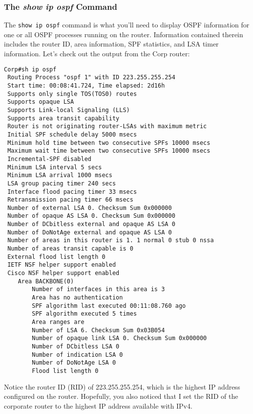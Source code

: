 \subsubsection[The \emph{show ip ospf}
Command]{\texorpdfstring{\protect\hypertarget{c18.xhtmlux5cux23c18-sec-12}{}{}The
\emph{show ip ospf} Command}{The show ip ospf Command}}

The \texttt{show\ ip\ ospf} command is what you'll need to display OSPF
information for one or all OSPF processes running on the router.
Information contained therein includes the router ID, area information,
SPF statistics, and LSA timer information. Let's check out the output
from the Corp router:

\begin{verbatim}
Corp#sh ip ospf
 Routing Process "ospf 1" with ID 223.255.255.254
 Start time: 00:08:41.724, Time elapsed: 2d16h
 Supports only single TOS(TOS0) routes
 Supports opaque LSA
 Supports Link-local Signaling (LLS)
 Supports area transit capability
 Router is not originating router-LSAs with maximum metric
 Initial SPF schedule delay 5000 msecs
 Minimum hold time between two consecutive SPFs 10000 msecs
 Maximum wait time between two consecutive SPFs 10000 msecs
 Incremental-SPF disabled
 Minimum LSA interval 5 secs
 Minimum LSA arrival 1000 msecs
 LSA group pacing timer 240 secs
 Interface flood pacing timer 33 msecs
 Retransmission pacing timer 66 msecs
 Number of external LSA 0. Checksum Sum 0x000000
 Number of opaque AS LSA 0. Checksum Sum 0x000000
 Number of DCbitless external and opaque AS LSA 0
 Number of DoNotAge external and opaque AS LSA 0
 Number of areas in this router is 1. 1 normal 0 stub 0 nssa
 Number of areas transit capable is 0
 External flood list length 0
 IETF NSF helper support enabled
 Cisco NSF helper support enabled
    Area BACKBONE(0)
        Number of interfaces in this area is 3
        Area has no authentication
        SPF algorithm last executed 00:11:08.760 ago
        SPF algorithm executed 5 times
        Area ranges are
        Number of LSA 6. Checksum Sum 0x03B054
        Number of opaque link LSA 0. Checksum Sum 0x000000
        Number of DCbitless LSA 0
        Number of indication LSA 0
        Number of DoNotAge LSA 0
        Flood list length 0
\end{verbatim}

Notice the router ID (RID) of 223.255.255.254, which is the highest IP
address configured on the router. Hopefully, you also noticed that I set
the RID of the corporate router to the highest IP address available with
IPv4.

